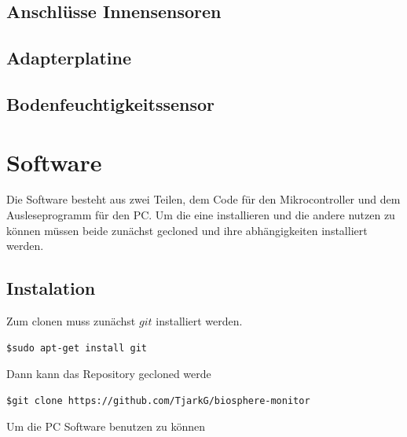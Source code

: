 \documentclass[12pt, a4paper, oneside]{report}
\begin{document}
\section{Anschlüsse Innensensoren}
\label{sec:Innensensoren}

\section{Adapterplatine}
\label{sec:Adapterplatine}

\section{Bodenfeuchtigkeitssensor}
\label{sec:Bodenfeuchtigkeitssensor}

\chapter{Software}
Die Software besteht aus zwei Teilen, dem Code für den Mikrocontroller und dem Ausleseprogramm für den PC. Um die eine installieren und die andere nutzen zu können müssen beide zunächst gecloned und ihre abhängigkeiten installiert werden.
\section{Instalation}
Zum clonen muss zunächst $git$ installiert werden.
\begin{lstlisting}
$sudo apt-get install git
\end{lstlisting}
Dann kann das Repository gecloned werde
\begin{lstlisting}
$git clone https://github.com/TjarkG/biosphere-monitor
\end{lstlisting}
Um die PC Software benutzen zu können 
\end{document}
